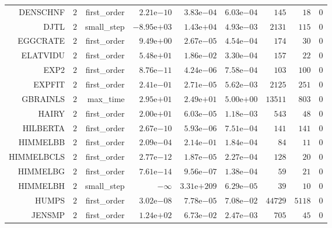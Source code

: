 \begin{longtable}{rrrrrrrrr}
DENSCHNF & \(     2\) & first\_order & \( 2.21\)e\(-10\) & \( 3.83\)e\(-04\) & \( 6.03\)e\(-04\) & \(   145\) & \(    18\) & \(     0\) \\
DJTL & \(     2\) & small\_step & \(-8.95\)e\(+03\) & \( 1.43\)e\(+04\) & \( 4.93\)e\(-03\) & \(  2131\) & \(   115\) & \(     0\) \\
EGGCRATE & \(     2\) & first\_order & \( 9.49\)e\(+00\) & \( 2.67\)e\(-05\) & \( 4.54\)e\(-04\) & \(   174\) & \(    30\) & \(     0\) \\
ELATVIDU & \(     2\) & first\_order & \( 5.48\)e\(+01\) & \( 1.86\)e\(-02\) & \( 3.30\)e\(-04\) & \(   157\) & \(    22\) & \(     0\) \\
EXP2 & \(     2\) & first\_order & \( 8.76\)e\(-11\) & \( 4.24\)e\(-06\) & \( 7.58\)e\(-04\) & \(   103\) & \(   100\) & \(     0\) \\
EXPFIT & \(     2\) & first\_order & \( 2.41\)e\(-01\) & \( 2.71\)e\(-05\) & \( 5.62\)e\(-03\) & \(  2125\) & \(   251\) & \(     0\) \\
GBRAINLS & \(     2\) & max\_time & \( 2.95\)e\(+01\) & \( 2.49\)e\(+01\) & \( 5.00\)e\(+00\) & \( 13511\) & \(   803\) & \(     0\) \\
HAIRY & \(     2\) & first\_order & \( 2.00\)e\(+01\) & \( 6.03\)e\(-05\) & \( 1.18\)e\(-03\) & \(   543\) & \(    48\) & \(     0\) \\
HILBERTA & \(     2\) & first\_order & \( 2.67\)e\(-10\) & \( 5.93\)e\(-06\) & \( 7.51\)e\(-04\) & \(   141\) & \(   141\) & \(     0\) \\
HIMMELBB & \(     2\) & first\_order & \( 2.09\)e\(-04\) & \( 2.14\)e\(-01\) & \( 1.84\)e\(-04\) & \(    84\) & \(    11\) & \(     0\) \\
HIMMELBCLS & \(     2\) & first\_order & \( 2.77\)e\(-12\) & \( 1.87\)e\(-05\) & \( 2.27\)e\(-04\) & \(   128\) & \(    20\) & \(     0\) \\
HIMMELBG & \(     2\) & first\_order & \( 7.61\)e\(-14\) & \( 9.56\)e\(-07\) & \( 1.38\)e\(-04\) & \(    59\) & \(    21\) & \(     0\) \\
HIMMELBH & \(     2\) & small\_step & \(-\infty\) & \(3.31\)e\(+209\) & \( 6.29\)e\(-05\) & \(    39\) & \(    10\) & \(     0\) \\
HUMPS & \(     2\) & first\_order & \( 3.02\)e\(-08\) & \( 7.78\)e\(-05\) & \( 7.08\)e\(-02\) & \( 44729\) & \(  5118\) & \(     0\) \\
JENSMP & \(     2\) & first\_order & \( 1.24\)e\(+02\) & \( 6.73\)e\(-02\) & \( 2.47\)e\(-03\) & \(   705\) & \(    45\) & \(     0\) \\

\end{longtable}
